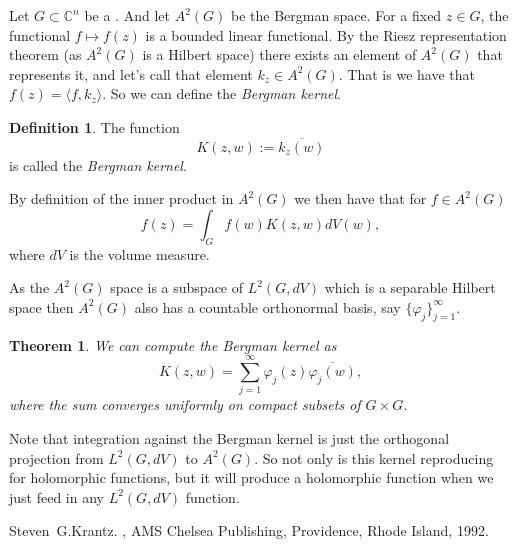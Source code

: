 \documentclass[12pt]{article}
\theoremstyle{theorem}
\newtheorem*{thm}{Theorem}
\theoremstyle{definition}
\newtheorem*{defn}{Definition}
\begin{document}
Let $G \subset {\mathbb{C}}^n$ be a .  And let $A^2(G)$ be the Bergman space.  For a fixed $z \in G$, the functional $f \mapsto f(z)$ is a bounded
linear functional.  By the Riesz representation theorem (as $A^2(G)$ is a Hilbert space) there exists an element of $A^2(G)$ that represents it, and
let's call that element $k_z \in A^2(G)$.  That is we have that
$f(z) = \langle f, k_z \rangle$.  So we can define the {\em Bergman kernel}.

\begin{defn}
The function 
\begin{equation*}
K(z,w) := \overline{k_z(w)}
\end{equation*}
is called the {\em Bergman kernel}.
\end{defn}

By definition of the inner product in $A^2(G)$ we then have that
for $f \in A^2(G)$
\begin{equation*}
f(z) =
\int_G f(w) K(z,w) dV(w) ,
\end{equation*}
where $dV$ is the volume measure.

As the $A^2(G)$ space is a subspace of $L^2(G,dV)$ which is a separable Hilbert space then $A^2(G)$ also has a countable orthonormal basis, say $\{ \varphi_j \}_{j=1}^\infty$.

\begin{thm}
We can compute the Bergman kernel as
\begin{equation*}
K(z,w) = \sum_{j=1}^\infty \varphi_j(z)\overline{\varphi_j(w)} ,
\end{equation*}
where the sum converges uniformly on compact subsets of $G \times G$.
\end{thm}

Note that integration against the Bergman kernel is just the orthogonal
projection from $L^2(G,dV)$ to $A^2(G)$.  So not only is this kernel reproducing for holomorphic functions, but it will produce a holomorphic function when we just feed in any $L^2(G,dV)$ function.

\begin{thebibliography}{9}
Steven~G.\@ Krantz.
{\em {}},
AMS Chelsea Publishing, Providence, Rhode Island, 1992.
\end{thebibliography}
\end{document}
